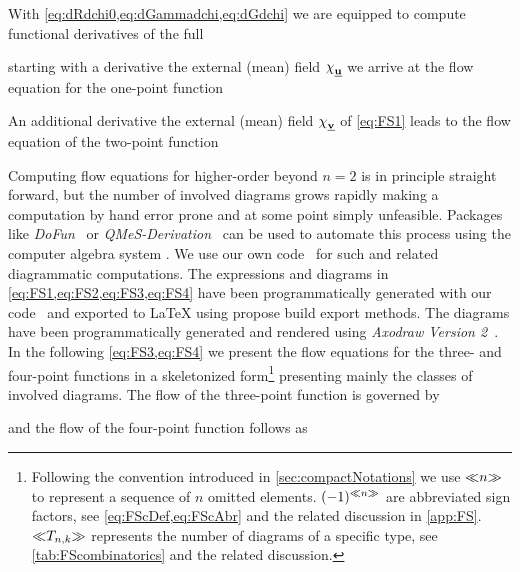 With \cref{eq:dRdchi0,eq:dGammadchi,eq:dGdchi} we are equipped to compute functional derivatives of the full \frgEq{}

starting with a \fs{} derivative \wrt{} the external (mean) field $\FSmf{\FSsf} {}_{\FSidxE{u}}$ we arrive at the flow equation for the one-point function

An additional \fs{} derivative \wrt{} the external (mean) field $\FSmf{\FSsf} {}_{\FSidxE{v}}$ of \cref{eq:FS1} leads to the flow equation of the two-point function

Computing flow equations for higher-order \nptFunctions{} beyond $n=2$ is in principle straight forward, but the number of involved diagrams grows rapidly making a computation by hand error prone and at some point simply unfeasible.
Packages like \textit{DoFun}~\cite{Huber:2019dkb,DoFun:GitHub} or \textit{QMeS-Derivation}~\cite{Pawlowski:2021tkk,QMeS:GitHub} can be used to automate this process using the computer algebra system \WAMwR.
We use our own \WAM{} code~\cite{Steil:2023PhDFlowEquationsNB} for such and related diagrammatic computations.
The expressions and diagrams in \cref{eq:FS1,eq:FS2,eq:FS3,eq:FS4} have been programmatically generated with our \WAM{} code~\cite{Steil:2023PhDFlowEquationsNB} and exported to \LaTeX{} using propose build export methods.
The diagrams have been programmatically generated and rendered using \textit{Axodraw Version 2}~\cite{Collins:2016aya}.
In the following \cref{eq:FS3,eq:FS4} we present the flow equations for the three- and four-point functions in a skeletonized form\footnote{%
	Following the convention introduced in \cref{sec:compactNotations} we use $\skeleton{n}$ to represent a sequence of $n$ omitted elements.
	$\FScSkeleton{}{n}{}$ are abbreviated \fs{} sign factors, see \cref{eq:FScDef,eq:FScAbr} and the related discussion in \cref{app:FS}.
	$\skeleton{T_{n,k}}$ represents the number of diagrams of a specific type, see \cref{tab:FScombinatorics} and the related discussion.
	
} presenting mainly the classes of involved diagrams.
The flow of the three-point function is governed by

and the flow of the four-point function follows as


